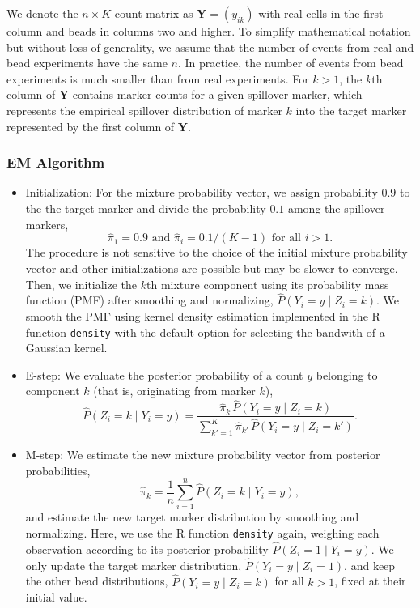 \documentclass{bioinfo}
\begin{document}
We denote the \(n \times K\) count matrix as \(\mathbf{Y} = (y_{ik})\)
with real cells in the first column and beads in columns two and higher.
To simplify mathematical notation but without loss of generality, we
assume that the number of events from real and bead experiments have the
same \(n\). In practice, the number of events from bead experiments is
much smaller than from real experiments. For \(k > 1\), the \(k\)th
column of \(\mathbf{Y}\) contains marker counts for a given spillover
marker, which represents the empirical spillover distribution of marker
\(k\) into the target marker represented by the first column of
\(\mathbf{Y}\).

\subsubsection{EM Algorithm}

\begin{itemize}
\item
  Initialization: For the mixture probability vector, we assign
  probability \(0.9\) to the the target marker and divide the
  probability \(0.1\) among the spillover markers, \[
  \hat{\pi}_{1} = 0.9 \text{ and } \hat{\pi}_i = 0.1/(K-1) \text{ for all } i > 1.
  \] The procedure is not sensitive to the choice of the initial mixture
  probability vector and other initializations are possible but may be
  slower to converge. Then, we initialize the \(k\)th mixture component
  using its probability mass function (PMF) after smoothing and
  normalizing, \(\widehat{P}(Y_i = y \mid Z_i = k)\). We smooth the PMF
  using kernel density estimation implemented in the R function
  \texttt{density} with the default option for selecting the bandwith of
  a Gaussian kernel.
\item
  E-step: We evaluate the posterior probability of a count \(y\)
  belonging to component \(k\) (that is, originating from marker \(k\)),
  \[
  \widehat{P}\left(Z_i = k \mid Y_i = y \right) = 
  \frac
  { \hat{\pi}_k \, \widehat{P}(Y_i = y \mid Z_i = k) }
  { \sum_{k' = 1}^K \hat{\pi}_{k'} \, \widehat{P}(Y_i = y \mid Z_i = k') }.
  \]
\item
  M-step: We estimate the new mixture probability vector from posterior
  probabilities, \[
  \hat{\pi}_k = 
  \frac{1}{n} \sum_{i = 1}^n \widehat{P}\left(Z_i = k \mid Y_i = y \right),
  \] and estimate the new target marker distribution by smoothing and
  normalizing. Here, we use the R function \texttt{density} again,
  weighing each observation according to its posterior probability
  \(\widehat{P} \left(Z_i = 1 \mid Y_i = y \right)\). We only update the
  target marker distribution, \(\widehat{P}(Y_i = y \mid Z_i = 1)\), and
  keep the other bead distributions,
  \(\widehat{P}(Y_i = y \mid Z_i = k)\) for all \(k > 1\), fixed at
  their initial value.
\end{itemize}
\end{document}
